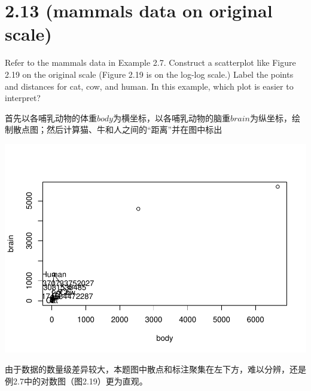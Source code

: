 \documentclass[]{article}
\newenvironment{Shaded}{\begin{snugshade}}{\end{snugshade}}
\newcommand{\DataTypeTok}[1]{\textcolor[rgb]{0.13,0.29,0.53}{#1}}
\newcommand{\DecValTok}[1]{\textcolor[rgb]{0.00,0.00,0.81}{#1}}
\newcommand{\KeywordTok}[1]{\textcolor[rgb]{0.13,0.29,0.53}{\textbf{#1}}}
\newcommand{\NormalTok}[1]{#1}
\newcommand{\OperatorTok}[1]{\textcolor[rgb]{0.81,0.36,0.00}{\textbf{#1}}}
\newcommand{\StringTok}[1]{\textcolor[rgb]{0.31,0.60,0.02}{#1}}
\begin{document}
\hypertarget{mammals-data-on-original-scale}{%
\section{2.13 (mammals data on original
scale)}\label{mammals-data-on-original-scale}}

Refer to the mammals data in Example 2.7. Construct a scatterplot like
Figure 2.19 on the original scale (Figure 2.19 is on the log-log scale.)
Label the points and distances for cat, cow, and human. In this example,
which plot is easier to interpret?

首先以各哺乳动物的体重\(body\)为横坐标，以各哺乳动物的脑重\(brain\)为纵坐标，绘制散点图；然后计算猫、牛和人之间的``距离''并在图中标出

\begin{Shaded}
\end{Shaded}

\includegraphics{Homework_2_files/figure-latex/unnamed-chunk-3-1.pdf}

由于数据的数量级差异较大，本题图中散点和标注聚集在左下方，难以分辨，还是例2.7中的对数图（图2.19）更为直观。
\end{document}
